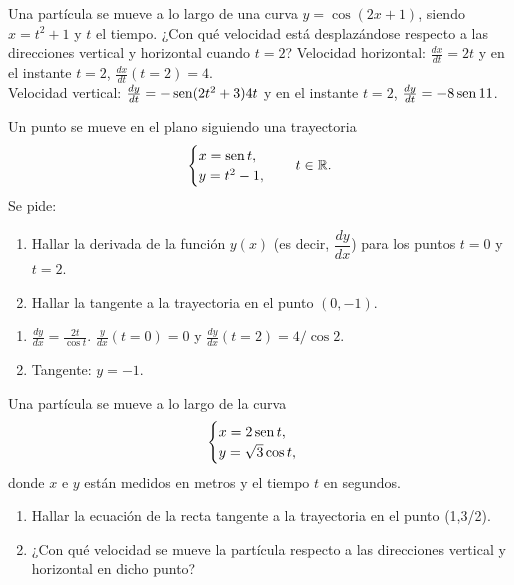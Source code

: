 
{Una partícula se mueve a lo largo de una curva $y=\cos(2x+1)$, siendo $x=t^2+1$ y $t$ el tiempo. ¿Con qué velocidad está desplazándose respecto a las direcciones vertical y horizontal cuando $t=2$?
}
{Velocidad horizontal: $\frac{dx}{dt} = 2t$ y en el instante $t=2$, $\frac{dx}{dt}(t=2)=4$.\\
Velocidad vertical: $\frac{dy}{dt}=-\operatorname{sen}(2t^2+3)4t$ y en el instante $t=2$, $\frac{dy}{dt}=-8\operatorname{sen} 11$.
}
{
}


{Un punto se mueve en el plano siguiendo una trayectoria
\[
\begin{cases}
x= \operatorname{sen} t,\\
y = t^2-1,
\end{cases}
\quad t\in \mathbb{R}.
\]
Se pide:
\begin{enumerate}
\item  Hallar la derivada de la función $y(x)$ (es decir, $\dfrac{dy}{dx}$) para los puntos $t=0$ y $t=2$.
\item  Hallar la tangente a la trayectoria en el punto $(0,-1)$.
\end{enumerate}
}
{\begin{enumerate}
\item $\frac{dy}{dx} = \frac{2t}{\cos t}$. $\frac{y}{dx}(t=0) = 0$ y $\frac{dy}{dx}(t=2) = 4/\cos 2$.
\item Tangente: $y=-1$.
\end{enumerate}
}
{
}


{Una partícula se mueve a lo largo de la curva
\[
\begin{cases}
x=2\operatorname{sen} t, \\
y=\sqrt{3}\cos t,
\end{cases}
\]
donde $x$ e $y$ están medidos en metros y el tiempo $t$ en
segundos.
\begin{enumerate}
\item  Hallar la ecuación de la recta tangente a la trayectoria en el punto (1,3/2).
\item  ¿Con qué velocidad se mueve la partícula respecto a las direcciones vertical y horizontal en dicho punto?
\end{enumerate}
}


